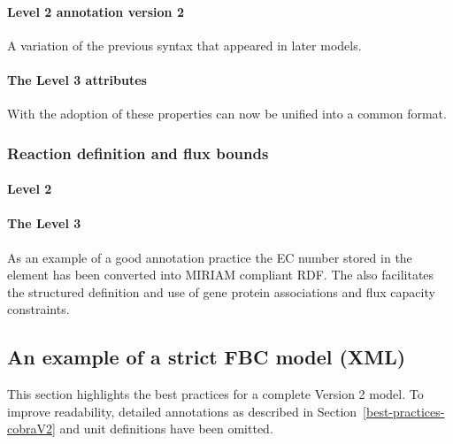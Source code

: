 \paragraph{\SBML Level 2 \Species annotation version 2}
A variation of the previous syntax that appeared in later models.

\bigskip\smallskip
{}

\paragraph{The \SBML Level 3 \FBC \Species attributes}
With the adoption of \SBML \FBC these \Species properties can now be unified into a common format.
%

\subsubsection*{Reaction definition and flux bounds}
\paragraph{\SBML Level 2 \Reaction}
%


\paragraph{The \SBML Level 3 \FBC \Reaction}

As an example of a good annotation practice the \textsf{EC number} stored in the \Notes element has been converted into MIRIAM compliant RDF. The \FBCPackage also facilitates the structured definition and use of gene protein associations and flux capacity constraints.
%
\bigskip\bigskip
{}
%

\newpage
\subsection{An example of a strict FBC model (XML)}
\label{best-practices-V2}
This section highlights the best practices for a complete \FBC Version 2 model. To improve readability, detailed annotations as described in Section~\ref{best-practices-cobraV2} and unit definitions have been omitted.


